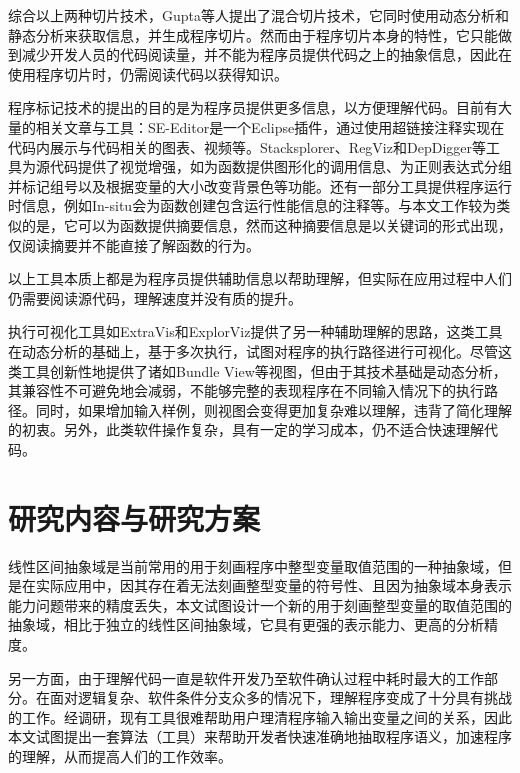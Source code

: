  综合以上两种切片技术，Gupta\cite{gupta1997hybrid}等人提出了混合切片技术，它同时使用动态分析和静态分析来获取信息，并生成程序切片。然而由于程序切片本身的特性，它只能做到减少开发人员的代码阅读量，并不能为程序员提供代码之上的抽象信息，因此在使用程序切片时，仍需阅读代码以获得知识。 
 
 程序标记技术的提出的目的是为程序员提供更多信息，以方便理解代码。目前有大量的相关文章与工具：SE-Editor\cite{schugerl2009beyond}是一个Eclipse插件，通过使用超链接注释实现在代码内展示与代码相关的图表、视频等。Stacksplorer\cite{karrer2011stacksplorer}、RegViz\cite{beck2014regviz}和DepDigger\cite{beyer2010depdigger}等工具为源代码提供了视觉增强，如为函数提供图形化的调用信息、为正则表达式分组并标记组号以及根据变量的大小改变背景色等功能。还有一部分工具提供程序运行时信息，例如In-situ\cite{beck2013situ}会为函数创建包含运行性能信息的注释等。与本文工作较为类似的是\cite{haiduc2010supporting}，它可以为函数提供摘要信息，然而这种摘要信息是以关键词的形式出现，仅阅读摘要并不能直接了解函数的行为。
 
 以上工具本质上都是为程序员提供辅助信息以帮助理解，但实际在应用过程中人们仍需要阅读源代码，理解速度并没有质的提升。 
 
 执行可视化工具如ExtraVis\cite{cornelissen2007understanding}和ExplorViz\cite{fittkau2013live}提供了另一种辅助理解的思路，这类工具在动态分析的基础上，基于多次执行，试图对程序的执行路径进行可视化。尽管这类工具创新性地提供了诸如Bundle View等视图，但由于其技术基础是动态分析，其兼容性不可避免地会减弱，不能够完整的表现程序在不同输入情况下的执行路径。同时，如果增加输入样例，则视图会变得更加复杂难以理解，违背了简化理解的初衷。另外，此类软件操作复杂，具有一定的学习成本，仍不适合快速理解代码。
 
 \section{研究内容与研究方案}
  
线性区间抽象域是当前常用的用于刻画程序中整型变量取值范围的一种抽象域，但是在实际应用中，因其存在着无法刻画整型变量的符号性、且因为抽象域本身表示能力问题带来的精度丢失，本文试图设计一个新的用于刻画整型变量的取值范围的抽象域，相比于独立的线性区间抽象域，它具有更强的表示能力、更高的分析精度。

另一方面，由于理解代码一直是软件开发乃至软件确认过程中耗时最大的工作部分。在面对逻辑复杂、软件条件分支众多的情况下，理解程序变成了十分具有挑战的工作。经调研，现有工具很难帮助用户理清程序输入输出变量之间的关系，因此本文试图提出一套算法（工具）来帮助开发者快速准确地抽取程序语义，加速程序的理解，从而提高人们的工作效率。

